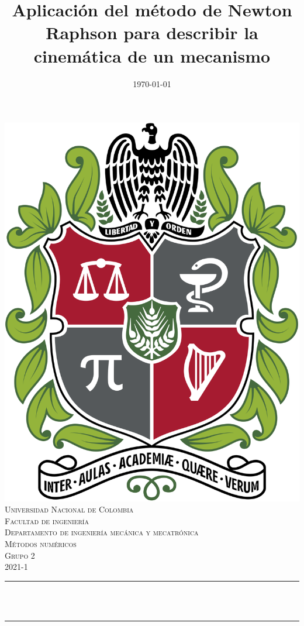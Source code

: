 \documentclass[12pt]{article}
\title{Aplicación del método de Newton Raphson para describir la cinemática de un mecanismo}%
\author{}								%
\date{\today}											%
\makeatletter
\let\thetitle\@title
\makeatother
\begin{document}
\begin{titlepage}
	\centering
    \vspace*{0.5 cm}
    \includegraphics[scale = 0.13]{UNAL.png}\\[2.0 cm]	%
    \textsc{\LARGE Universidad Nacional de Colombia}\\[0.3 cm]	%
    \textsc{Facultad de ingeniería}\\[0.6 cm]	%
    \textsc{Departamento de ingeniería mecánica y mecatrónica}\\[0.6 cm]	
     \textsc{Métodos numéricos}\\[0.6 cm]
      \textsc{Grupo 2}\\[0.6 cm]
	\textsc{\Large 2021-1}\\[1 cm]				%
	\rule{\linewidth}{0.2 mm} \\[0.4 cm]
	{ \huge \bfseries \thetitle}\\
	\rule{\linewidth}{0.2 mm} \\[0.8 cm]
	

\end{titlepage}
\end{document}
